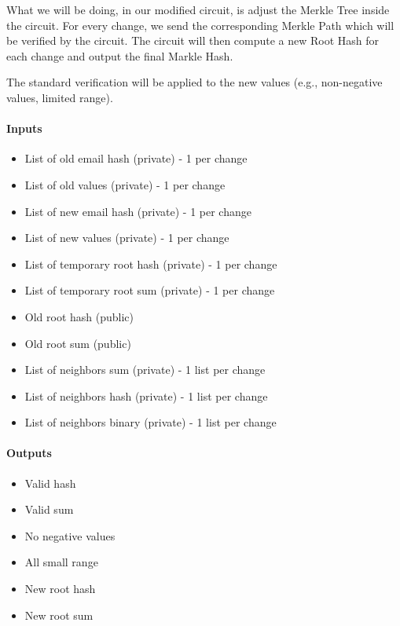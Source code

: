 What we will be doing, in our modified circuit, is adjust the Merkle Tree inside the circuit.
For every change, we send the corresponding Merkle Path which will be verified by the circuit.
The circuit will then compute a new Root Hash for each change and output the final Markle Hash.

The standard verification will be applied to the new values (e.g., non-negative values, limited range).

\paragraph{Inputs}
\begin{itemize}
   \item List of old email hash (private) - 1 per change
   \item List of old values (private) - 1 per change
   \item List of new email hash (private) - 1 per change
   \item List of new values (private) - 1 per change
   \item List of temporary root hash (private) - 1 per change
   \item List of temporary root sum (private) - 1 per change
   \item Old root hash (public)
   \item Old root sum (public)
   \item List of neighbors sum (private) - 1 list per change
   \item List of neighbors hash (private) - 1 list per change
   \item List of neighbors binary (private) - 1 list per change
\end{itemize}

\paragraph{Outputs}
\begin{itemize}
   \item Valid hash
   \item Valid sum
   \item No negative values
   \item All small range
   \item New root hash 
   \item New root sum
   \end{itemize}

